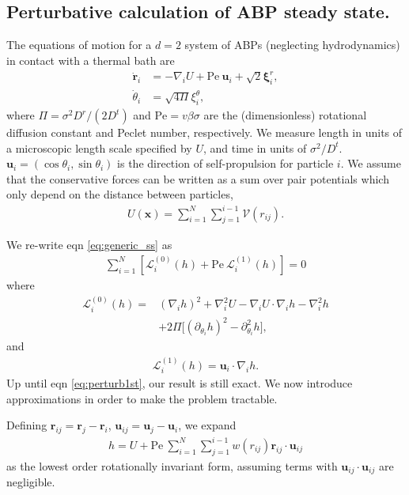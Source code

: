 \documentclass[twocolumn,amsmath,amssymb,aps]{revtex4-1}%
\begin{document}
\subsection{Perturbative calculation of ABP steady state.}
The equations of motion for a $d=2$ system of ABPs (neglecting hydrodynamics)
in contact with a thermal bath are
\begin{subequations}
  \label{eqs:ABPsEOMs}
  \begin{align}
    \dot{\bm{r}}_i
    &= -\nabla_i U+\mathrm{Pe}\:\bm{u}_i + \sqrt{2}\bm{\xi}_{i}^r,
    \label{eq:pos_EOM}\\
    \dot{\theta}_i &= \sqrt{4\Pi}\xi_i^{\theta}\label{eq:theta_EOM},
  \end{align}
\end{subequations}
where $\Pi=\sigma^2D^r/(2D^t)$ and $\mathrm{Pe} = v\beta\sigma$ are the
(dimensionless) rotational diffusion constant and Peclet number,
respectively. We measure length in units of a microscopic length
scale specified by $ U$, and time in units of $\sigma^2/D^t$.
$\bm{u}_i = (\cos\theta_i,\sin\theta_i)$ is the direction
of self-propulsion for particle $i$. We assume that the conservative
forces can be written as a sum over
pair potentials which only depend on the distance between particles,
\begin{align}\label{eq:HtoV}
   U(\bm{x}) = \sum_{i=1}^N\sum_{j=1}^{i-1}\mathcal{V}(r_{ij}).
\end{align}

We re-write eqn \ref{eq:generic_ss} as
\begin{align}\label{eq:perturbODE}
  \sum_{i=1}^N[\mathcal{L}_i^{(0)}(h)+\mathrm{Pe}\:\mathcal{L}_i^{(1)}(h)]
  = 0
\end{align}
where
\begin{align}\label{eq:perturb0th}
  \mathcal{L}_i^{(0)}(h)=&(\nabla_i h)^2 + \nabla_i^2 U
  -\nabla_i U\cdot\nabla_ih-\nabla_i^2h\nonumber\\
  &+2\Pi\big[(\partial_{\theta_i}h)^2-\partial_{\theta_i}^2h\big],
\end{align}
and
\begin{align}\label{eq:perturb1st}
  \mathcal{L}_i^{(1)}(h)=\bm{u}_i\cdot\nabla_ih.
\end{align}
Up until eqn \ref{eq:perturb1st}, our result is still exact. We now
introduce approximations in order to make the problem tractable.

Defining $\bm{r}_{ij}=\bm{r}_j-\bm{r}_i$, $\bm{u}_{ij}=\bm{u}_j-\bm{u}_i$,
we expand
\begin{align}\label{eq:hgeneric}
  h= U+\mathrm{Pe}\:\sum_{i=1}^N\sum_{j=1}^{i-1}w(r_{ij})
  \bm{r}_{ij}\cdot\bm{u}_{ij}
\end{align}
as the lowest order rotationally invariant form, assuming terms with
$\bm{u}_{ij}\cdot\bm{u}_{ij}$ are negligible.
\end{document}
